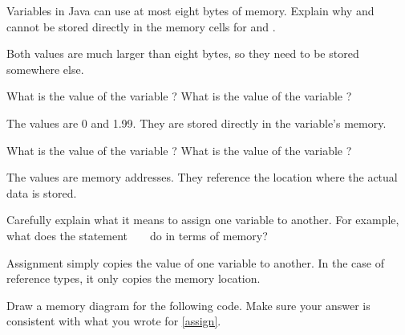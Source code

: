 \Q Variables in Java can use at most eight bytes of memory. Explain why  and  cannot be stored directly in the memory cells for  and .

\begin{answer}
Both values are much larger than eight bytes, so they need to be stored somewhere else.
\end{answer}


\Q What is the value of the variable ? What is the value of the variable ?

\begin{answer}
The values are 0 and 1.99. They are stored directly in the variable's memory.
\end{answer}


\Q What is the value of the variable ? What is the value of the variable ?

\begin{answer}
The values are memory addresses. They reference the location where the actual data is stored.
\end{answer}


\Q \label{assign} Carefully explain what it means to assign one variable to another. For example, what does the statement ~ ~ do in terms of memory?

\begin{answer}
Assignment simply copies the value of one variable to another.
In the case of reference types, it only copies the memory location.
\end{answer}


\Q Draw a memory diagram for the following code. Make sure your answer is consistent with what you wrote for \ref{assign}.

